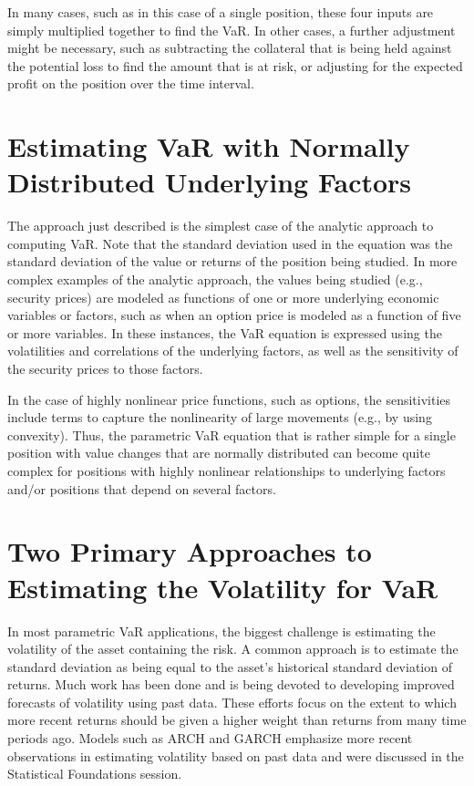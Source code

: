 \documentclass[11pt]{article}
\begin{document}
In many cases, such as in this case of a single position, these four inputs are simply multiplied together to find the VaR. In other cases, a further adjustment might be necessary, such as subtracting the collateral that is being held against the potential loss to find the amount that is at risk, or adjusting for the expected profit on the position over the time interval.

\section*{Estimating VaR with Normally Distributed Underlying Factors}
The approach just described is the simplest case of the analytic approach to computing VaR. Note that the standard deviation used in the equation was the standard deviation of the value or returns of the position being studied. In more complex examples of the analytic approach, the values being studied (e.g., security prices) are modeled as functions of one or more underlying economic variables or factors, such as when an option price is modeled as a function of five or more variables. In these instances, the VaR equation is expressed using the volatilities and correlations of the underlying factors, as well as the sensitivity of the security prices to those factors.

In the case of highly nonlinear price functions, such as options, the sensitivities include terms to capture the nonlinearity of large movements (e.g., by using convexity). Thus, the parametric VaR equation that is rather simple for a single position with value changes that are normally distributed can become quite complex for positions with highly nonlinear relationships to underlying factors and/or positions that depend on several factors.

\section*{Two Primary Approaches to Estimating the Volatility for VaR}
In most parametric VaR applications, the biggest challenge is estimating the volatility of the asset containing the risk. A common approach is to estimate the standard deviation as being equal to the asset's historical standard deviation of returns. Much work has been done and is being devoted to developing improved forecasts of volatility using past data. These efforts focus on the extent to which more recent returns should be given a higher weight than returns from many time periods ago. Models such as ARCH and GARCH emphasize more recent observations in estimating volatility based on past data and were discussed in the Statistical Foundations session.
\end{document}
